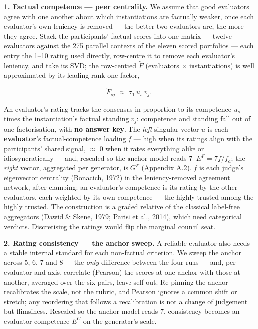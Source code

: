 \documentclass{article}
\begin{document}
\textbf{1. Factual competence --- peer centrality.} We assume that good evaluators agree with one another about which instantiations are factually weaker, once each evaluator's own leniency is removed --- the better two evaluators are, the more they agree. Stack the participants' factual scores into one matrix --- twelve evaluators against the 275 parallel contexts of the eleven scored portfolios --- each entry the 1--10 rating used directly, row-centre it to remove each evaluator's leniency, and take its SVD; the row-centred \(\tilde F\) (evaluators \ensuremath{\times} instantiations) is well approximated by its leading rank-one factor,

\[\tilde F_{sj} \;\approx\; \sigma_1\, u_s\, v_j . \tag{1}\]

An evaluator's rating tracks the consensus in proportion to its competence \(u_s\) times the instantiation's factual standing \(v_j\): competence and standing fall out of one factorisation, with \textbf{no answer key}. The \emph{left} singular vector \(u\) is each \textbf{evaluator}'s factual-competence loading \(f\) --- high when its ratings align with the participants' shared signal, \ensuremath{\approx} 0 when it rates everything alike or idiosyncratically --- and, rescaled so the anchor model reads 7, \(E^{F} = 7f/f_a\); the \emph{right} vector, aggregated per generator, is \(G^{F}\) (Appendix A.2). \(f\) is each judge's eigenvector centrality (Bonacich, 1972) in the leniency-removed agreement network, after clamping: an evaluator's competence is its rating by the other evaluators, each weighted by its own competence --- the highly trusted among the highly trusted. The construction is a graded relative of the classical label-free aggregators (Dawid \& Skene, 1979; Parisi et al., 2014), which need categorical verdicts. Discretising the ratings would flip the marginal council seat.

\textbf{2. Rating consistency --- the anchor sweep.} A reliable evaluator also needs a stable internal standard for each non-factual criterion. We sweep the anchor across 5, 6, 7 and 8 --- the \emph{only} difference between the four runs --- and, per evaluator and axis, correlate (Pearson) the scores at one anchor with those at another, averaged over the six pairs, leave-self-out. Re-pinning the anchor recalibrates the scale, not the rubric, and Pearson ignores a common shift or stretch; any reordering that follows a recalibration is not a change of judgement but flimsiness. Rescaled so the anchor model reads 7, consistency becomes an evaluator competence \(E^{C}\) on the generator's scale.
\end{document}

